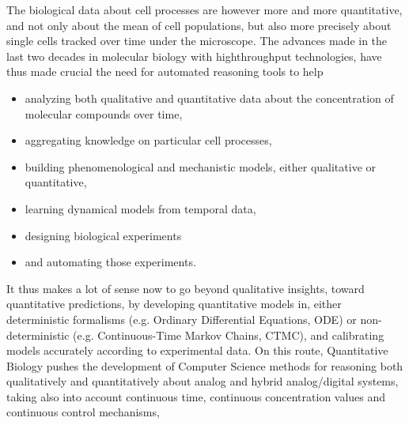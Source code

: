 \documentclass[graybox]{svmult}
\begin{document}
The biological data about cell processes are however more and more quantitative, and not only about the mean of cell populations,
but also more precisely about single cells tracked over time under the microscope.
The advances made in the last two decades in molecular biology with highthroughput technologies,
have thus made crucial the need for automated reasoning tools to help
\begin{itemize}
  \item analyzing both qualitative and quantitative data about the concentration of molecular compounds over time,
  \item aggregating knowledge on particular cell processes,
  \item building phenomenological and mechanistic models, either qualitative or quantitative,
  \item learning dynamical models from temporal data,
  \item designing biological experiments
  \item and automating those experiments.
    \end{itemize}

It thus makes a lot of sense now to go beyond qualitative insights,
toward quantitative predictions,
by developing quantitative models in, either deterministic formalisms (e.g. Ordinary Differential Equations, ODE) or non-deterministic (e.g. Continuous-Time Markov Chains, CTMC),
and calibrating models accurately according to experimental data.
On this route, Quantitative Biology pushes the development of Computer Science methods for reasoning both qualitatively and quantitatively about analog  and hybrid analog/digital systems,
taking also into account continuous time, continuous concentration values and continuous control mechanisms,
\end{document}
